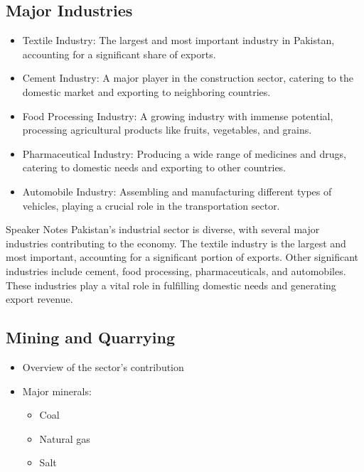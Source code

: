\documentclass[
  letterpaper,
  DIV=11,
  numbers=noendperiod]{scrartcl}
\providecommand{\tightlist}{%
  \setlength{\itemsep}{0pt}\setlength{\parskip}{0pt}}\usepackage{longtable,booktabs,array}
\begin{document}
\subsection{Major Industries}\label{major-industries}

\begin{itemize}
\tightlist
\item
  Textile Industry: The largest and most important industry in Pakistan,
  accounting for a significant share of exports.
\item
  Cement Industry: A major player in the construction sector, catering
  to the domestic market and exporting to neighboring countries.
\item
  Food Processing Industry: A growing industry with immense potential,
  processing agricultural products like fruits, vegetables, and grains.
\item
  Pharmaceutical Industry: Producing a wide range of medicines and
  drugs, catering to domestic needs and exporting to other countries.
\item
  Automobile Industry: Assembling and manufacturing different types of
  vehicles, playing a crucial role in the transportation sector.
\end{itemize}

Speaker Notes Pakistan's industrial sector is diverse, with several
major industries contributing to the economy. The textile industry is
the largest and most important, accounting for a significant portion of
exports. Other significant industries include cement, food processing,
pharmaceuticals, and automobiles. These industries play a vital role in
fulfilling domestic needs and generating export revenue.

\subsection{Mining and Quarrying}\label{mining-and-quarrying}

\begin{itemize}
\tightlist
\item
  Overview of the sector's contribution
\item
  Major minerals:

  \begin{itemize}
  \tightlist
  \item
    Coal
  \item
    Natural gas
  \item
    Salt
  \end{itemize}
\end{itemize}
\end{document}

